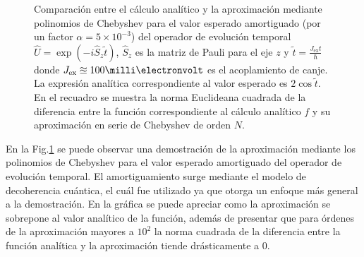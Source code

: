 \begin{figure}[htb]
	\centering
	
	\caption[Valor esperado para el operador de evolución temporal amortiguado]{Comparación entre el cálculo analítico y la aproximación mediante polinomios de Chebyshev para el valor esperado amortiguado (por un factor $\alpha = 5\times 10^{-3}$) del operador de evolución temporal $\hat{U} = \exp(-i \hat{S}_z \tilde{t})$, $\hat{S}_z$ es la matriz de Pauli para el eje $z$ y $\tilde{t} = \frac{J_{\mathrm{ex}}t}{\hbar}$ donde $J_{\mathrm{ex}}\approxeq 100\milli\electronvolt$ es el acoplamiento de canje. La expresión analítica correspondiente al valor esperado es $2\cos{\tilde{t}}$. En el recuadro se muestra la norma Euclideana cuadrada de la diferencia entre la función correspondiente al cálculo analítico $f$ y su aproximación en serie de Chebyshev de orden $N$.}
	\label{fig:comparison}
\end{figure}

En la Fig.\ref{fig:comparison} se puede observar una demostración de la aproximación mediante los polinomios de Chebyshev para el valor esperado amortiguado del operador de evolución temporal. El amortiguamiento surge mediante el modelo de decoherencia cuántica, el cuál fue utilizado ya que otorga un enfoque más general a la demostración. En la gráfica se puede apreciar como la aproximación se sobrepone al valor analítico de la función, además de presentar que para órdenes de la aproximación mayores a $10^2$ la norma cuadrada de la diferencia entre la función analítica y la aproximación tiende drásticamente a $0$. 